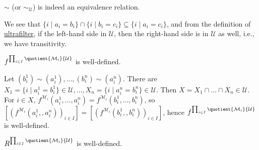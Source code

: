 \begin{note}
	\(\sim \) (or \(\sim _\mathcal{U} \)) is indeed an equivalence relation.
\end{note}
\begin{explanation}
	We see that \(\{i \mid a_i = b_i\} \cap \{i \mid b_i = c_i\} \subseteq \{i \mid a_i = c_i\}\), and from the definition of \hyperref[def:ultrafilter]{ultrafilter}, if the left-hand side in \(\mathcal{U} \), then the right-hand side is in \(\mathcal{U} \) as well, i.e., we have transitivity.
\end{explanation}

\begin{note}
	\(f^{\prod_{i\in I} \quotient{\mathcal{M} _i}{\mathcal{U} } }\) is well-defined.
\end{note}
\begin{explanation}
	Let \((b_i^1) \sim (a_i^1), \dots , (b_i^n) \sim (a_i^n)\). There are \(X_1 = \{i \mid a_i^1 = b_i^1\} \in \mathcal{U} , \dots , X_n = \{i \mid a_i^n = b_i^n\}\in \mathcal{U} \). Then \(X = X_1 \cap \dots \cap X_n \in \mathcal{U} \). For \(i\in X\), \(f^{\mathcal{M} _i}(a_i^1, \dots , a_i^n) = f^{\mathcal{M} _i}(b_i^1, \dots , b_i^n)\), so \([(f^{\mathcal{M} _i}(a_i^1, , a_i^n))_{i\in I}] = [(f^{\mathcal{M} _i}(b_i^1, , b_i^n))_{i\in I}]\), hence \(f^{\prod_{i\in I} \quotient{\mathcal{M} _i}{\mathcal{U} } }\) is well-defined.
\end{explanation}

\begin{note}
	\(R^{\prod_{i\in I} \quotient{\mathcal{M} _i}{\mathcal{U} } }\) is well-defined.
\end{note}